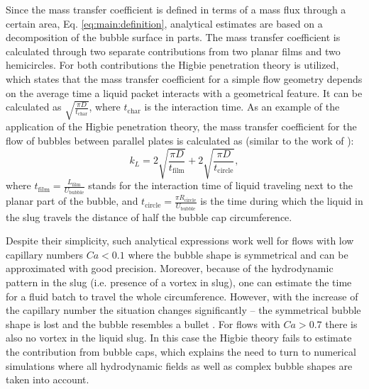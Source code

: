 \documentclass[preprint,12pt]{elsarticle}
\newcommand{\beq}{\begin{equation}}
\newcommand{\feq}{\end{equation}}
\newcommand{\lfilm}{L_{\mathrm{film}}}
\newcommand{\ububble}{U_{\mathrm{bubble}}}
\begin{document}
Since the mass transfer coefficient is defined in terms of a mass flux through a certain area, Eq. \ref{eq:main:definition},
analytical estimates \cite{kreutzer-overview,irandoust} are based on a decomposition of the bubble surface in parts. The mass
 transfer coefficient is calculated through two separate contributions from two planar films and two hemicircles. For both 
contributions the Higbie penetration theory \cite{higbie} is utilized, which states that the mass transfer coefficient
 for a simple flow geometry depends on the average time a liquid packet interacts with a geometrical feature. It 
can be calculated as $\sqrt{\frac{\pi D}{t_{\mathrm{char}}}}$, where $t_{\mathrm{char}}$ is the interaction 
time. As an example of the application of the Higbie penetration theory,
 the mass  transfer coefficient 
for the flow of bubbles between parallel plates  is calculated as (similar to the work of \citet{vanbaten-circular}):
\beq
k_L=2 \sqrt{\frac{\pi D}{t_{\mathrm{film}}}}+2 \sqrt{\frac{\pi D}{t_{\mathrm{circle}}}},
\feq
where $t_{\mathrm{film}}=\frac{\lfilm}{\ububble}$ stands for the interaction time of liquid traveling next to the planar part
 of the bubble, and $t_{\mathrm{circle}}=\frac{\pi R_{\mathrm{circle}}}{\ububble}$ is the time during which the liquid in the slug travels the distance of half the bubble cap circumference. 

Despite their simplicity, such analytical expressions work well for flows with low
capillary numbers $Ca<0.1$ \cite{bercic-mass} where the bubble shape is
symmetrical and can be approximated with good precision. Moreover, because of the
hydrodynamic pattern in the slug (i.e. presence of a vortex in slug), one can
estimate the time for a fluid batch to travel the whole circumference.   However,
with the increase of the capillary number the situation changes significantly -- the
symmetrical bubble shape is lost and the bubble resembles a bullet \cite{kuzmin-binary2d}.
For flows with $Ca>0.7$ there is also no vortex in the liquid slug. In this case the Higbie theory fails
to estimate the contribution from bubble caps, which explains the need to turn to numerical simulations where all
hydrodynamic fields as well as complex bubble shapes are taken into account.
\end{document}
